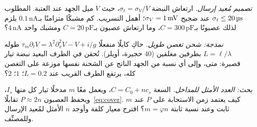 \begin{exercise}[\lvlB]
\label{ex:19:5}
\emph{تصميم مُعيد إرسال.} ارتعاش النبضة $\sigma_t=\sigma_V/\dot V$، حيث $\dot V$ ميل الجهد عند العتبة. المطلوب $\sigma_t\le20\,\text{\textmu s}$ عند ضجيج $\sigma_V=1\,\text{mV}$؛ أهمل التسريب. كم مشبكًا متزامنًا بـ$0.1\,\text{nA}$ يلزم لذلك عصبونًا بـ$C=300\,\text{pF}$، وما ارتعاش عصبون بـ$C=20\,\text{pF}$ ومشبك واحد $4\,\text{nA}$؟
\end{exercise}

\begin{exercise}[\lvlB]
\label{ex:19:6}
\emph{نمذجة: شحن تغصن طويل.} حاكِ كابلًا منفعلًا $\tau_m\partial_tV=\lambda^2\partial_x^2V-V+i/g$ طوله $L=\ell/\lambda$ بطرفين مغلقين ($40$ حجيرة، أويلر). تُحقن في الطرف البعيد نبضة تيار قصيرة: متى، وإلى أي نسبة من الجهد الناتج عن الشحنة نفسها موزعة على التغصن كله، يرتفع الطرف القريب عند $L=0.2$؛ $1$؛ $2$؟
\end{exercise}

\begin{exercise}[\lvlC]
\label{ex:19:7}
\emph{بحث: العدد الأمثل للمداخل.} السعة $C=C_0+nc_s$، ويعمل معًا $m$ مدخلًا تيار كل منها $I_s$، ويحفظ العصبون $P\approx2n$ تقابلًا~\eqref{eq:cover}. كيف يعتمد زمن الاستجابة على $P$ عند $m$ ثابت وعند نسبة ثابتة $m=\varphi n$؟ اقترح معيار كلفة وأوجد $n$ الأمثل لمُعيد الإرسال وللمصنِّف.
\end{exercise}
